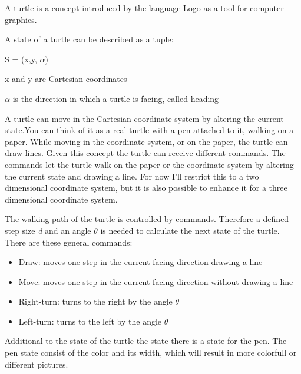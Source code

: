 \documentclass[english]{cpp-hmwk}
\begin{document}
\noindent A turtle is a concept introduced by the language Logo as a tool for computer graphics.\cite[Cf. Chapter 10, p.~179]{harvey1997computer}

\noindent A state of a turtle can be described as a tuple\cite[Cf. Chapter 1.3, p.~6ff]{prusinkiewiczp.lindenmayera.2004}:

\begin{center}
S = (x,y, $\alpha$)
\end{center}

x and y are Cartesian coordinates

$\alpha$ is the direction in which a turtle is facing, called heading

\medskip

\noindent A turtle can move in the Cartesian coordinate system by altering the current state.You can think of it as a real turtle with a pen attached to it, walking on a paper. While moving in the coordinate system, or on the paper, the turtle can draw lines. Given this concept the turtle can receive different commands. The commands let the turtle walk on the paper or the coordinate system by altering the current state and drawing a line. For now I'll restrict this to a two dimensional coordinate system, but it is also possible to enhance it for a three dimensional coordinate system.

\medskip

\noindent The walking path of the turtle is controlled by commands. Therefore a defined step size \textit{d} and an angle \textit{$\theta$ } is needed to calculate the next state of the turtle. There are these general commands: \cite[Cf. Chapter 2]{goldman2004turtle}

\begin{itemize}
\item Draw: moves one step in the current facing direction drawing a line 
\item Move: moves one step in the current facing direction without drawing a line
\item Right-turn: turns to the right by the angle $\theta$
\item Left-turn: turns to the left by the angle $\theta$
\end{itemize}

\noindent Additional to the state of the turtle the state there is a state for the pen. The pen state consist of the color and its width, which will result in more colorfull or different pictures.

\medskip
\end{document}
